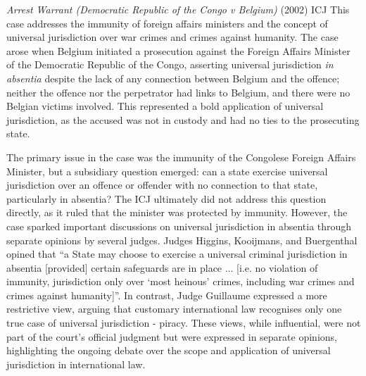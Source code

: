 \begin{casedetails}{\textit{Arrest Warrant (Democratic Republic of the Congo v Belgium)} (2002) ICJ}
    \flushleft
    This case addresses the immunity of foreign affairs ministers and the concept of universal jurisdiction over war crimes and crimes against humanity. The case arose when Belgium initiated a prosecution against the Foreign Affairs Minister of the Democratic Republic of the Congo, asserting universal jurisdiction \textit{in absentia} despite the lack of any connection between Belgium and the offence; neither the offence nor the perpetrator had links to Belgium, and there were no Belgian victims involved. This represented a bold application of universal jurisdiction, as the accused was not in custody and had no ties to the prosecuting state.

    \vspace{\baselineskip}
    
    The primary issue in the case was the immunity of the Congolese Foreign Affairs Minister, but a subsidiary question emerged: can a state exercise universal jurisdiction over an offence or offender with no connection to that state, particularly in absentia? The ICJ ultimately did not address this question directly, as it ruled that the minister was protected by immunity. However, the case sparked important discussions on universal jurisdiction in absentia through separate opinions by several judges. Judges Higgins, Kooijmans, and Buergenthal opined that ``a State may choose to exercise a universal criminal jurisdiction in absentia [provided] certain safeguards are in place ... [i.e. no violation of immunity, jurisdiction only over `most heinous' crimes, including war crimes and crimes against humanity]''. In contrast, Judge Guillaume expressed a more restrictive view, arguing that customary international law recognises only one true case of universal jurisdiction - piracy. These views, while influential, were not part of the court's official judgment but were expressed in separate opinions, highlighting the ongoing debate over the scope and application of universal jurisdiction in international law.
\end{casedetails}

